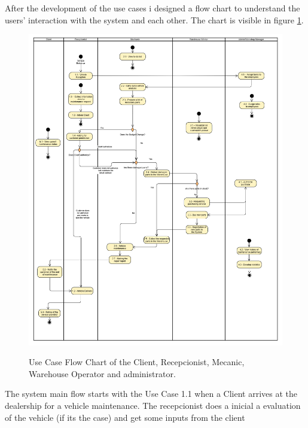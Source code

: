 After the development of the use cases i designed a flow chart to understand the users' interaction with the system and each other. The chart is visible in figure \ref{fig:figure2}.

\begin{figure}[h]
  \caption{Use Case Flow Chart of the Client, Recepcionist, Mecanic, Warehouse Operator and administrator.}
  \centering
  \includegraphics[width=\textwidth]{figs/UseCaseDiagram}
  \label{fig:figure2}
\end{figure}

The system main flow starts with the Use Case 1.1 when a Client arrives at the dealership for a vehicle maintenance. 
The recepcionist does a inicial a evaluation of the vehicle (if its the case) and get some inputs from the client 